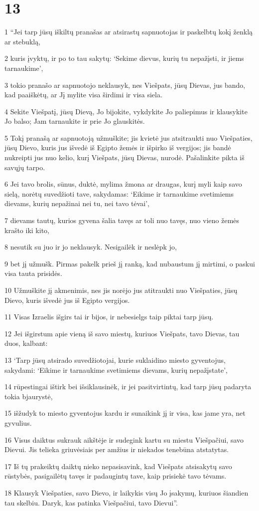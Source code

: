 \chapter{13}


\par 1 “Jei tarp jūsų iškiltų pranašas ar atsirastų sapnuotojas ir paskelbtų kokį ženklą ar stebuklą, 
\par 2 kuris įvyktų, ir po to tau sakytų: ‘Sekime dievus, kurių tu nepažįsti, ir jiems tarnaukime’, 
\par 3 tokio pranašo ar sapnuotojo neklausyk, nes Viešpats, jūsų Dievas, jus bando, kad paaiškėtų, ar Jį mylite visa širdimi ir visa siela. 
\par 4 Sekite Viešpatį, jūsų Dievą, Jo bijokite, vykdykite Jo paliepimus ir klausykite Jo balso; Jam tarnaukite ir prie Jo glauskitės. 
\par 5 Tokį pranašą ar sapnuotoją užmuškite; jis kvietė jus atsitraukti nuo Viešpaties, jūsų Dievo, kuris jus išvedė iš Egipto žemės ir išpirko iš vergijos; jis bandė nukreipti jus nuo kelio, kurį Viešpats, jūsų Dievas, nurodė. Pašalinkite pikta iš savųjų tarpo. 
\par 6 Jei tavo brolis, sūnus, duktė, mylima žmona ar draugas, kurį myli kaip savo sielą, norėtų suvedžioti tave, sakydamas: ‘Eikime ir tarnaukime svetimiems dievams, kurių nepažinai nei tu, nei tavo tėvai’, 
\par 7 dievams tautų, kurios gyvena šalia tavęs ar toli nuo tavęs, nuo vieno žemės krašto iki kito, 
\par 8 nesutik su juo ir jo neklausyk. Nesigailėk ir neslėpk jo, 
\par 9 bet jį užmušk. Pirmas pakelk prieš jį ranką, kad nubaustum jį mirtimi, o paskui visa tauta prisidės. 
\par 10 Užmuškite jį akmenimis, nes jis norėjo jus atitraukti nuo Viešpaties, jūsų Dievo, kuris išvedė jus iš Egipto vergijos. 
\par 11 Visas Izraelis išgirs tai ir bijos, ir nebesielgs taip piktai tarp jūsų. 
\par 12 Jei išgirstum apie vieną iš savo miestų, kuriuos Viešpats, tavo Dievas, tau duos, kalbant: 
\par 13 ‘Tarp jūsų atsirado suvedžiotojai, kurie suklaidino miesto gyventojus, sakydami: ‘Eikime ir tarnaukime svetimiems dievams, kurių nepažįstate’, 
\par 14 rūpestingai ištirk bei išsiklausinėk, ir jei pasitvirtintų, kad tarp jūsų padaryta tokia bjaurystė, 
\par 15 išžudyk to miesto gyventojus kardu ir sunaikink jį ir visa, kas jame yra, net gyvulius. 
\par 16 Visus daiktus sukrauk aikštėje ir sudegink kartu su miestu Viešpačiui, savo Dievui. Jis telieka griuvėsiais per amžius ir niekados tenebūna atstatytas. 
\par 17 Iš tų prakeiktų daiktų nieko nepasisavink, kad Viešpats atsisakytų savo rūstybės, pasigailėtų tavęs ir padaugintų tave, kaip prisiekė tavo tėvams. 
\par 18 Klausyk Viešpaties, savo Dievo, ir laikykis visų Jo įsakymų, kuriuos šiandien tau skelbiu. Daryk, kas patinka Viešpačiui, tavo Dievui”.



